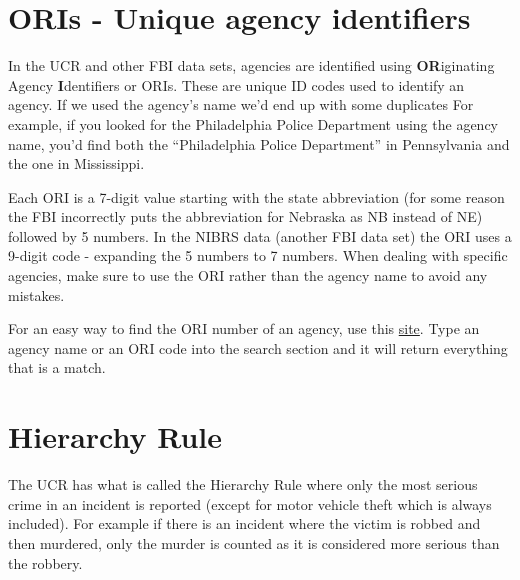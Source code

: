 \documentclass[
  12pt,
]{book}
\newenvironment{Shaded}{\begin{snugshade}}{\end{snugshade}}
\newcommand{\CommentTok}[1]{\textcolor[rgb]{0.37,0.37,0.37}{\textit{#1}}}
\newcommand{\DecValTok}[1]{\textcolor[rgb]{0.06,0.06,0.06}{#1}}
\newcommand{\KeywordTok}[1]{\textcolor[rgb]{0.27,0.27,0.27}{\textbf{#1}}}
\newcommand{\NormalTok}[1]{#1}
\newcommand{\OperatorTok}[1]{\textcolor[rgb]{0.43,0.43,0.43}{\textbf{#1}}}
\begin{document}
\hypertarget{oris---unique-agency-identifiers}{%
\section{ORIs - Unique agency identifiers}\label{oris---unique-agency-identifiers}}

In the UCR and other FBI data sets, agencies are identified using \textbf{OR}iginating Agency \textbf{I}dentifiers or ORIs. These are unique ID codes used to identify an agency. If we used the agency's name we'd end up with some duplicates For example, if you looked for the Philadelphia Police Department using the agency name, you'd find both the ``Philadelphia Police Department'' in Pennsylvania and the one in Mississippi.

\begin{Shaded}
\end{Shaded}

Each ORI is a 7-digit value starting with the state abbreviation (for some reason the FBI incorrectly puts the abbreviation for Nebraska as NB instead of NE) followed by 5 numbers. In the NIBRS data (another FBI data set) the ORI uses a 9-digit code - expanding the 5 numbers to 7 numbers. When dealing with specific agencies, make sure to use the ORI rather than the agency name to avoid any mistakes.

For an easy way to find the ORI number of an agency, use this \href{http://crimedatatool.com/crosswalk.html}{site}. Type an agency name or an ORI code into the search section and it will return everything that is a match.

\hypertarget{hierarchy-rule}{%
\section{Hierarchy Rule}\label{hierarchy-rule}}

The UCR has what is called the Hierarchy Rule where only the most serious crime in an incident is reported (except for motor vehicle theft which is always included). For example if there is an incident where the victim is robbed and then murdered, only the murder is counted as it is considered more serious than the robbery.
\end{document}
